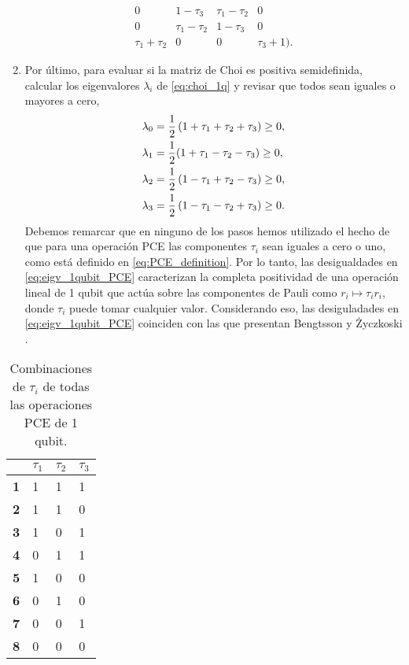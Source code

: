 \begin{enumerate}
\begin{align}
		0 & 1-\tau _3 & \tau _1-\tau _2 & 0 \\
		0 & \tau _1-\tau _2 & 1-\tau _3 & 0 \\
		\tau _1+\tau _2 & 0 & 0 & \tau _3+1 
		).
	\end{align}
	\item Por último, para evaluar si la matriz de Choi es positiva semidefinida, 
	calcular los eigenvalores $\lambda_i$ de \eqref{eq:choi_1q} y revisar que 
	todos sean 	iguales o mayores a cero,
	\begin{subequations}\label{eq:eigv_1qubit_PCE}
		\begin{align}
			\lambda_0=\frac{1}{2}& \left(1+\tau _1+\tau _2+\tau _3\right)\geq0, \\
			\lambda_1=\frac{1}{2}& \qty(1+\tau _1-\tau _2-\tau _3)\geq0, \\
			\lambda_2=\frac{1}{2}& \left(1-\tau _1+\tau _2-\tau _3\right)\geq0, \\
			\lambda_3=\frac{1}{2}& \left(1-\tau _1-\tau _2+\tau _3\right)\geq0.
		\end{align}
	\end{subequations}
	Debemos remarcar que en ninguno de los pasos hemos utilizado el hecho de que
	para una operación PCE las componentes $\tau_i$ sean iguales a cero o uno,
	como está definido en \eqref{eq:PCE_definition}. Por lo tanto, las 
	desigualdades en \eqref{eq:eigv_1qubit_PCE} caracterizan la completa 
	positividad de una operación lineal de 1 qubit que actúa sobre las
	componentes de Pauli como $r_i\longmapsto \tau_ir_i$, donde $\tau_i$
	puede tomar cualquier valor. Considerando eso, 
	las desiguladades en \eqref{eq:eigv_1qubit_PCE} coinciden con las 
	que presentan 	Bengtsson y Życzkoski
	 \cite[pág. 292]{bengtsson_zyczkowski_2017}.
\end{enumerate}

\begin{table}[] 
\centering
\begin{tabular}{|l|l|l|l|}
\hline
           & $\tau_1$ & $\tau_2$ & $\tau_3$ \\ \hline
\textbf{1} & 1        & 1        & 1        \\ \hline
\textbf{2} & 1        & 1        & 0        \\ \hline
\textbf{3} & 1        & 0        & 1        \\ \hline
\textbf{4} & 0        & 1        & 1        \\ \hline
\textbf{5} & 1        & 0        & 0        \\ \hline
\textbf{6} & 0        & 1        & 0        \\ \hline
\textbf{7} & 0        & 0        & 1        \\ \hline
\textbf{8} & 0        & 0        & 0        \\ \hline
\end{tabular}
\caption{Combinaciones de $\tau_i$ de todas las operaciones PCE de 1 qubit.}
\label{tab:1qubit_PCE}
\end{table}

